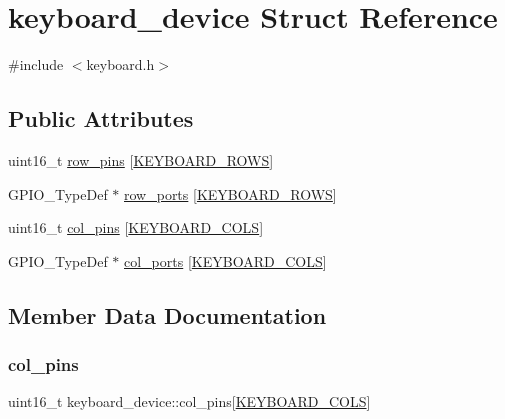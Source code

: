 \hypertarget{structkeyboard__device}{}\section{keyboard\+\_\+device Struct Reference}
\label{structkeyboard__device}


{\ttfamily \#include $<$keyboard.\+h$>$}

\subsection*{Public Attributes}
\begin{DoxyCompactItemize}
\item 
uint16\+\_\+t \hyperlink{structkeyboard__device_afb61cd72f0bdd515150a10e46e9ecfc3}{row\+\_\+pins} \mbox{[}\hyperlink{keymap_8h_ab89c69b09d4ca01020b7c40d9ca2bab8}{K\+E\+Y\+B\+O\+A\+R\+D\+\_\+\+R\+O\+WS}\mbox{]}
\item 
G\+P\+I\+O\+\_\+\+Type\+Def $\ast$ \hyperlink{structkeyboard__device_a3538201c09ca68013a086626a63ca362}{row\+\_\+ports} \mbox{[}\hyperlink{keymap_8h_ab89c69b09d4ca01020b7c40d9ca2bab8}{K\+E\+Y\+B\+O\+A\+R\+D\+\_\+\+R\+O\+WS}\mbox{]}
\item 
uint16\+\_\+t \hyperlink{structkeyboard__device_a6158bcd702e65e7f692b53c0c43958ed}{col\+\_\+pins} \mbox{[}\hyperlink{keymap_8h_ada65ea6a2010790e481acf033b2f8351}{K\+E\+Y\+B\+O\+A\+R\+D\+\_\+\+C\+O\+LS}\mbox{]}
\item 
G\+P\+I\+O\+\_\+\+Type\+Def $\ast$ \hyperlink{structkeyboard__device_ac896175bb4e598e4e62671f2525d93b5}{col\+\_\+ports} \mbox{[}\hyperlink{keymap_8h_ada65ea6a2010790e481acf033b2f8351}{K\+E\+Y\+B\+O\+A\+R\+D\+\_\+\+C\+O\+LS}\mbox{]}
\end{DoxyCompactItemize}


\subsection{Member Data Documentation}
\mbox{\label{structkeyboard__device_a6158bcd702e65e7f692b53c0c43958ed}} 
\subsubsection{\texorpdfstring{col\+\_\+pins}{col\_pins}}
{\footnotesize\ttfamily uint16\+\_\+t keyboard\+\_\+device\+::col\+\_\+pins\mbox{[}\hyperlink{keymap_8h_ada65ea6a2010790e481acf033b2f8351}{K\+E\+Y\+B\+O\+A\+R\+D\+\_\+\+C\+O\+LS}\mbox{]}}

